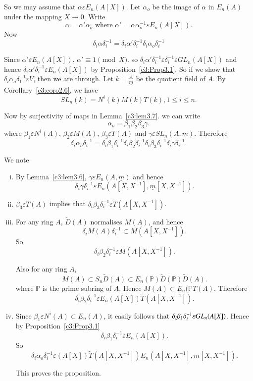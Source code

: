 \begin{PRFF1}
So we may assume that $\alpha \varepsilon E_n(A[X])$. Let $\alpha_o$
be the image of $\alpha$ in $E_n(A)$ under the mapping $X\rightarrow
0$. Write
$$
\alpha=\alpha'\alpha_o\text{ where }
\alpha'=\alpha\alpha^{-1}_o\varepsilon E_n(A[X]).
$$
Now
$$
\delta_i\alpha \delta^{-1}_i=\delta_i\alpha'\delta^{-1}_i\delta_i\alpha_o\delta^{-1}_i
$$

Since $\alpha' \varepsilon E_n(A[X])$, $\alpha'\equiv 1\pmod X$. so
$\delta_i\alpha' \delta^{-1}_i\varepsilon \delta^{-1}_i\varepsilon
GL_n(A[X])$ and hence $\delta_i\alpha'\delta^{-1}_i\varepsilon
E_n(A[X])$ by Proposition~\ref{c3:Prop3.1}. So if we show that
$\delta_i\alpha_o\delta^{-1}_1\varepsilon V$, then we are through. Let
$k=\frac{A}{\underline{m}}$ be the quotient field of $A$. By
Corollary~\ref{c3:coro2.6}, we have
$$
SL_n(k)=N^{i}(k)M(k)T(k),1\leq i\leq n.
$$

Now by surjectivity of maps in Lemma~\ref{c3:lem3.7}. we can write
$$
\alpha_o=\beta_1\beta_2\beta_3\gamma.
$$
where $\beta_1\varepsilon N^{i}(A)$, $\beta_2\varepsilon M(A)$,
$\beta_3\varepsilon T(A)$ and $\gamma \varepsilon
SL_n(A,\underline{m})$. Therefore 
$$
\delta_i\alpha_o\delta^{-1}_i=\delta_i\beta_1\delta^{-1}_i\delta_i\beta_2\delta^{-1}_i\delta_i\beta_3\delta^{-1}_i\delta_i\gamma\delta^{-1}_i.
$$

We note 
\begin{enumerate}[(i)]
\item By Lemma~\ref{c3:lem3.6}, $\gamma \varepsilon
  E_n(A,\underline{m})$ and hence
$$
\delta_i\gamma \delta^{-1}_i\varepsilon E_n\left(A\left[X,X^{-1}\right],\underline{m}\left[X,X^{-1}\right]\right).
$$
\item $\beta_3\varepsilon T(A)$ implies that
  $\delta_i\beta_3\delta^{-1}_i\varepsilon
  \tilde{T}\left(A\left[X,X^{-1}\right]\right)$. 
\item For any ring $A$, $\tilde{D}(A)$ normalises $M(A)$, and hence
$$
\delta_iM(A)\delta^{-1}_i\subset M\left(A\left[X,X^{-1}\right]\right).
$$
So
$$
\delta_i\beta_2\delta^{-1}_i\varepsilon
M\left(A\left[X,X^{-1}\right]\right).
$$

Also for any ring $A$,
$$
M(A)\subset S_n\tilde{D}(A)\subset E_n(\mathbb{P})\tilde{D}(\mathbb{P})\tilde{D}(A).
$$
where $\mathbb{P}$ is the prime subring of $A$. Hence $M(A)\subset
E_n(\mathbb{P}T(A)$. Therefore 
$$
\delta_i\beta_2\delta^{-1}_i\varepsilon E_n(A[X])\tilde{T}\left(A\left[X,X^{-1}\right]\right).
$$
\item Since $\beta_1\varepsilon N^{i}(A)\subset E_n(A)$, it easily
  follows that $\delta_i\beta_1\delta_i^{-1}\\\varepsilon
  GL_n(A[X])$. Hence by Proposition~\ref{c3:Prop3.1}
$$
\delta_i\beta_1\delta^{-1}_i\varepsilon E_n(A[X]).
$$ 
So
$$
\delta_i\alpha_o\delta^{-1}_i\varepsilon
(A[X])\tilde{T}\left(A\left[X,X^{-1}\right]\right)E_n\left(A\left[X,X^{-1}\right],\underline{m}\left[X,X^{-1}\right]\right).
$$

This proves the proposition.
\end{enumerate}
\enprf
\end{PRFF1}

